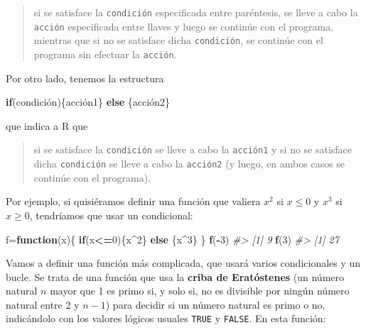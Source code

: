 \documentclass[
]{book}
\newenvironment{Shaded}{\begin{snugshade}}{\end{snugshade}}
\newcommand{\CommentTok}[1]{\textcolor[rgb]{0.56,0.35,0.01}{\textit{#1}}}
\newcommand{\ControlFlowTok}[1]{\textcolor[rgb]{0.13,0.29,0.53}{\textbf{#1}}}
\newcommand{\DecValTok}[1]{\textcolor[rgb]{0.00,0.00,0.81}{#1}}
\newcommand{\KeywordTok}[1]{\textcolor[rgb]{0.13,0.29,0.53}{\textbf{#1}}}
\newcommand{\NormalTok}[1]{#1}
\newcommand{\OperatorTok}[1]{\textcolor[rgb]{0.81,0.36,0.00}{\textbf{#1}}}
\theoremstyle{definition}
\theoremstyle{definition}
\theoremstyle{definition}
\theoremstyle{remark}
\begin{document}
\begin{quote}
si se satisface la \texttt{condición} especificada entre paréntesis, se lleve a cabo la \texttt{acción} especificada entre llaves y luego se continúe con el programa, mientras que si no se satisface dicha \texttt{condición}, se continúe con el programa sin efectuar la \texttt{acción}.
\end{quote}

Por otro lado, tenemos la estructura

\begin{Shaded}
\begin{Highlighting}[]
\ControlFlowTok{if}\NormalTok{(condición)\{acción1\} }\ControlFlowTok{else}\NormalTok{ \{acción2\}}
\end{Highlighting}
\end{Shaded}

que indica a R que

\begin{quote}
si se satisface la \texttt{condición} se lleve a cabo la \texttt{acción1} y si no se satisface dicha \texttt{condición} se lleve a cabo la \texttt{acción2} (y luego, en ambos casos se continúe con el programa).
\end{quote}

Por ejemplo, si quisiéramos definir una función que valiera \(x^2\) si \(x\leqslant 0\) y \(x^3\) si \(x\geqslant 0\), tendríamos que usar un condicional:

\begin{Shaded}
\begin{Highlighting}[]
\NormalTok{f=}\ControlFlowTok{function}\NormalTok{(x)\{}
  \ControlFlowTok{if}\NormalTok{(x}\OperatorTok{\textless{}=}\DecValTok{0}\NormalTok{)\{x}\OperatorTok{\^{}}\DecValTok{2}\NormalTok{\} }\ControlFlowTok{else}\NormalTok{ \{x}\OperatorTok{\^{}}\DecValTok{3}\NormalTok{\}}
\NormalTok{\}}
\KeywordTok{f}\NormalTok{(}\OperatorTok{{-}}\DecValTok{3}\NormalTok{)}
\CommentTok{\#\textgreater{} [1] 9}
\KeywordTok{f}\NormalTok{(}\DecValTok{3}\NormalTok{)}
\CommentTok{\#\textgreater{} [1] 27}
\end{Highlighting}
\end{Shaded}

Vamos a definir una función más complicada, que usará varios condicionales y un bucle. Se trata de una función que usa la \textbf{criba de Eratóstenes} (un número natural \(n\) mayor que 1 es primo si, y solo si, no es divisible por ningún número natural entre 2 y \(n-1\)) para decidir si un número natural es primo o no, indicándolo con los valores lógicos usuales \texttt{TRUE} y \texttt{FALSE}. En esta función:
\end{document}
